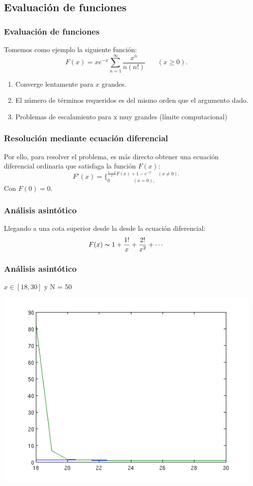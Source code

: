 \documentclass{beamer}
\begin{document}
\subsection{Evaluación de funciones}
\frame
{
\frametitle{Evaluación de funciones}
Tomemos como ejemplo la siguiente función:
$$
	F(x) = x e^{-x} \sum_{n=1}^{\infty}\frac{x^n}{n(n!)}	\ \ \ \ \ \ \ \ (x
\ge 0).  
$$
\begin{enumerate}
	\item Converge lentamente para $x$ grandes.
	\item El número de términos requeridos es del mismo orden que el argumento dado.
	\item Problemas de escalamiento para x muy grandes (límite computacional)
\end{enumerate}
}

\frame
{
\frametitle{Resolución mediante ecuación diferencial}
Por ello, para resolver el problema, es más directo obtener una ecuación diferencial ordinaria que
satisfaga la función $F(x)$:
$$
F'(x) = \{^{\frac{1-x}{x}F(x) + 1 - e^{-x} \ \ \ \ \ \ (x \neq 0),}_{0 \ \ \ \
\ \ \ \ \ \ \ \ \ \ \ \ \ \ \ \ \ \ (x = 0), }
$$
Con $F(0) = 0$.\\
}

\frame
{
\frametitle{Análisis asintótico}
Llegando a una cota superior desde la desde la ecuación diferencial:
$$
F(x) \thicksim 1 + \frac{1!}{x} + \frac{2!}{x^2} + \cdots
$$
}

\frame
{
\frametitle{Análisis asintótico}
$x \in [18,30]$ y N = 50

\begin{center}
\includegraphics[scale=0.5]{../informe/images/2a.png}
\end{center}
}
\end{document}
